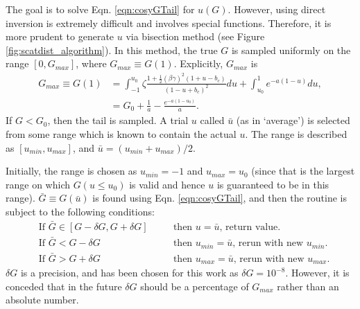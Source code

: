 The goal is to solve Eqn. \ref{eqn:cosyGTail} for $u(G)$. However, using direct inversion is extremely difficult and involves special functions. Therefore, it is more prudent to generate  $u$ via bisection method (see Figure \ref{fig:scatdist_algorithm}). In this method, the true $G$ is sampled uniformly on the range $[0,G_{max}]$, where $G_{max} \equiv G(1)$. Explicitly, $G_{max}$ is
\begin{align*}
G_{max}\equiv G(1) &=\int_{-1} ^{u_0} \zeta\frac{1+\frac{1}{2}(\beta\gamma)^2(1+u-b_c)}{(1-u+b_c)^2}du+\int_{u_0} ^1 e^{-a(1-u)} du,\\
&= G_0+\frac{1}{a}-\frac{e^{-a(1-u_0)}}{a}.
\end{align*}
If $G < G_0$, then the tail is sampled. A trial $u$ called $\bar{u}$ (as in `average') is selected from some range which is known to contain the actual $u$. The range is described as $[u_{min},u_{max}]$, and $\bar{u}=(u_{min}+u_{max})/2$. 

Initially, the range is chosen as $u_{min}=-1$ and $u_{max}=u_0$ (since that is the largest range on which $G(u \leq u_0)$ is valid and hence $u$ is guaranteed to be in this range). $\bar{G} \equiv G(\bar{u})$ is found using Eqn. \ref{eqn:cosyGTail}, and then the routine is subject to the following conditions:
\begin{align*}
&\text{If } \bar{G}\in [G-\delta G,G+\delta G] &\quad &\text{then } u=\bar{u}\text{, return value.}\\
&\text{If } \bar{G} < G-\delta G &\quad &\text{then } u_{min}=\bar{u} \text{, rerun with new }u_{min}.\\
&\text{If } \bar{G} > G+\delta G &\quad &\text{then } u_{max}=\bar{u} \text{, rerun with new }u_{max}.
\end{align*}
$\delta G$ is a precision, and has been chosen for this work as $\delta G = 10^{-8}$. However, it is conceded that in the future $\delta G$ should be a percentage of $G_{max}$ rather than an absolute number.


